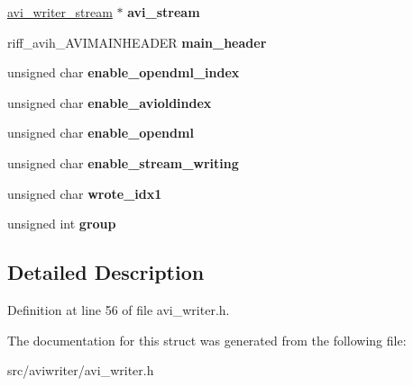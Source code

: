 \begin{DoxyCompactItemize}
\item 
\hypertarget{structavi__writer_a55f25ac16fdee1b49b9f3d7c5945b4e1}{\hyperlink{structavi__writer__stream}{avi\-\_\-writer\-\_\-stream} $\ast$ {\bfseries avi\-\_\-stream}}\label{structavi__writer_a55f25ac16fdee1b49b9f3d7c5945b4e1}

\item 
\hypertarget{structavi__writer_ae45d37b94f464140c7b72d34afc6872f}{riff\-\_\-avih\-\_\-\-A\-V\-I\-M\-A\-I\-N\-H\-E\-A\-D\-E\-R {\bfseries main\-\_\-header}}\label{structavi__writer_ae45d37b94f464140c7b72d34afc6872f}

\item 
\hypertarget{structavi__writer_a86bcbf4355e480c468d022a242c409cd}{unsigned char {\bfseries enable\-\_\-opendml\-\_\-index}}\label{structavi__writer_a86bcbf4355e480c468d022a242c409cd}

\item 
\hypertarget{structavi__writer_a6d6f583c63a41c8bdafab08917be0502}{unsigned char {\bfseries enable\-\_\-avioldindex}}\label{structavi__writer_a6d6f583c63a41c8bdafab08917be0502}

\item 
\hypertarget{structavi__writer_a20a72d9c0c02aad7e29d990a95bbd6ee}{unsigned char {\bfseries enable\-\_\-opendml}}\label{structavi__writer_a20a72d9c0c02aad7e29d990a95bbd6ee}

\item 
\hypertarget{structavi__writer_a782cf8d91dbac349e50a41d235992981}{unsigned char {\bfseries enable\-\_\-stream\-\_\-writing}}\label{structavi__writer_a782cf8d91dbac349e50a41d235992981}

\item 
\hypertarget{structavi__writer_a6aef002eb800b9bc3f8c46514d3a643f}{unsigned char {\bfseries wrote\-\_\-idx1}}\label{structavi__writer_a6aef002eb800b9bc3f8c46514d3a643f}

\item 
\hypertarget{structavi__writer_a67dd537f434d6ed39afce1674de95b34}{unsigned int {\bfseries group}}\label{structavi__writer_a67dd537f434d6ed39afce1674de95b34}

\end{DoxyCompactItemize}


\subsection{Detailed Description}


Definition at line 56 of file avi\-\_\-writer.\-h.



The documentation for this struct was generated from the following file\-:\begin{DoxyCompactItemize}
\item 
src/aviwriter/avi\-\_\-writer.\-h\end{DoxyCompactItemize}
